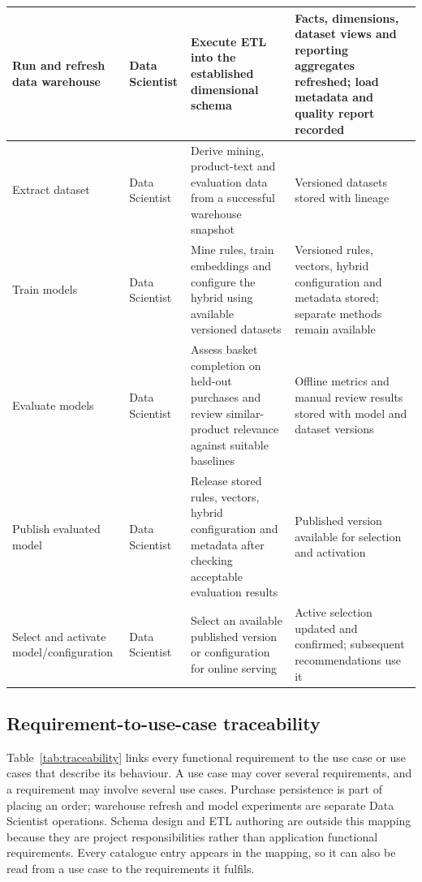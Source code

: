 \documentclass[a4paper,12pt]{article}
\newlength{\tablecontentwidth}
\begin{document}
{\begin{longtable}{|L{0.20\tablecontentwidth}|L{0.14\tablecontentwidth}|L{0.33\tablecontentwidth}|L{0.33\tablecontentwidth}|}
  Run and refresh data warehouse & Data Scientist & Execute ETL into the established dimensional
    schema & Facts, dimensions, dataset views and reporting aggregates refreshed; load metadata
    and quality report recorded \\[3pt]\hline
  Extract dataset & Data Scientist & Derive mining, product-text and evaluation data from a
    successful warehouse snapshot & Versioned datasets stored with lineage \\[3pt]\hline
  Train models & Data Scientist & Mine rules, train embeddings and configure the hybrid using
    available versioned datasets & Versioned rules, vectors, hybrid configuration and metadata
    stored; separate methods remain available \\[3pt]\hline
  Evaluate models & Data Scientist & Assess basket completion on held-out purchases and review
    similar-product relevance against suitable baselines & Offline metrics and manual review results
    stored with model and dataset versions \\[3pt]\hline
  Publish evaluated model & Data Scientist & Release stored rules, vectors, hybrid configuration
    and metadata after checking acceptable evaluation results & Published version available for
    selection and activation \\[3pt]\hline
  Select and activate model/configuration & Data Scientist & Select an available published version
    or configuration for online serving & Active selection updated and confirmed; subsequent
    recommendations use it \\[3pt]\hline
\end{longtable}
}

\subsection{Requirement-to-use-case traceability}
\label{sec:traceability}

Table~\ref{tab:traceability} links every functional requirement to the use case or use cases that
describe its behaviour. A use case may cover several requirements, and a requirement may involve
several use cases. Purchase persistence is part of placing an order; warehouse refresh and model
experiments are separate Data Scientist operations. Schema design and ETL authoring are outside this
mapping because they are project responsibilities rather than application functional requirements.
Every catalogue entry appears in the mapping, so it can also be read from a use case to the
requirements it fulfils.
\end{document}
